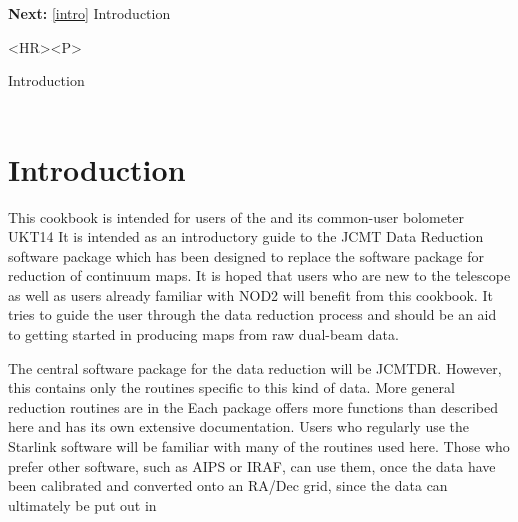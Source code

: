 \begin{latexonly}
{\bf Next:} \ref{intro} Introduction\\
\end{latexonly}

\begin{htmlonly}
\begin{rawhtml} <HR><P> \end{rawhtml}
{\bf {}} Introduction\\
{\bf {}}\\
\end{htmlonly}


\section{\label{intro}Introduction}

   This cookbook is intended for users of the
   and its common-user bolometer UKT14
   It is intended as an introductory guide to the JCMT Data Reduction
   software package
   which has been designed to replace the
   software package for reduction of
   continuum maps. It is hoped that users who are new to the telescope
   as well as users already familiar with NOD2 will benefit from this
   cookbook. It tries to guide the user through the data reduction
   process and should be an aid to
   getting started in producing maps from raw dual-beam data.

   The central software package for the data reduction will be JCMTDR.
   However, this contains only the routines specific to this kind of
   data. More general reduction routines are
   in the
   Each package offers
   more functions than described here and has its own extensive
   documentation.
   Users who regularly use the Starlink software will be familiar with
   many of the routines used here. Those who prefer other software,
   such as AIPS or IRAF, can use them, once the data have been
   calibrated and converted onto an RA/Dec grid, since the data
   can ultimately be put out in

